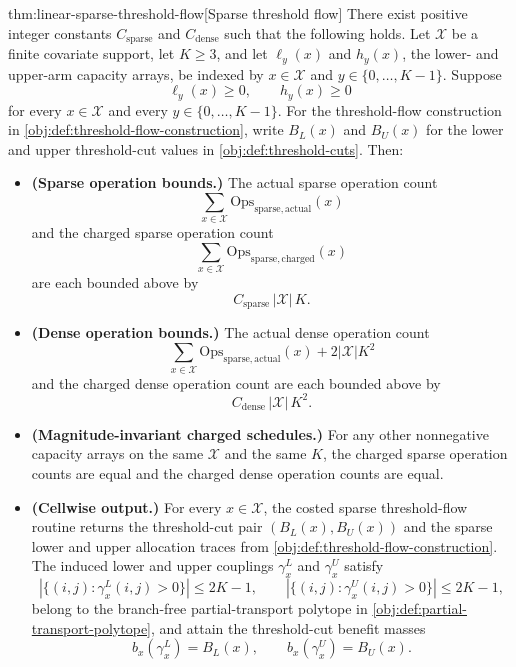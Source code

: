\documentclass[11pt]{article}
\begin{document}
\begin{theoremv}{thm:linear-sparse-threshold-flow}[Sparse threshold flow]
There exist positive integer constants \(C_{\mathrm{sparse}}\) and \(C_{\mathrm{dense}}\) such that the following holds.  Let \(\mathcal X\) be a finite covariate support, let \(K\ge 3\), and let \(\ell_y(x)\) and \(h_y(x)\), the lower- and upper-arm capacity arrays, be indexed by \(x\in\mathcal X\) and \(y\in\{0,\ldots,K-1\}\).  Suppose
\[
\ell_y(x)\ge 0,\qquad h_y(x)\ge 0
\]
for every \(x\in\mathcal X\) and every \(y\in\{0,\ldots,K-1\}\).  For the threshold-flow construction in \cref{obj:def:threshold-flow-construction}, write \(B_L(x)\) and \(B_U(x)\) for the lower and upper threshold-cut values in \cref{obj:def:threshold-cuts}.  Then:
\begin{itemize}
\item \textbf{(Sparse operation bounds.)} The actual sparse operation count
\[
\sum_{x\in\mathcal X}\mathrm{Ops}_{\mathrm{sparse,actual}}(x)
\]
and the charged sparse operation count
\[
\sum_{x\in\mathcal X}\mathrm{Ops}_{\mathrm{sparse,charged}}(x)
\]
are each bounded above by
\[
C_{\mathrm{sparse}}\,|\mathcal X|\,K .
\]

\item \textbf{(Dense operation bounds.)} The actual dense operation count
\[
\sum_{x\in\mathcal X}\mathrm{Ops}_{\mathrm{sparse,actual}}(x)+2|\mathcal X|K^2
\]
and the charged dense operation count are each bounded above by
\[
C_{\mathrm{dense}}\,|\mathcal X|\,K^2 .
\]

\item \textbf{(Magnitude-invariant charged schedules.)} For any other nonnegative capacity arrays on the same \(\mathcal X\) and the same \(K\), the charged sparse operation counts are equal and the charged dense operation counts are equal.

\item \textbf{(Cellwise output.)} For every \(x\in\mathcal X\), the costed sparse threshold-flow routine returns the threshold-cut pair \((B_L(x),B_U(x))\) and the sparse lower and upper allocation traces from \cref{obj:def:threshold-flow-construction}.  The induced lower and upper couplings \(\gamma_x^L\) and \(\gamma_x^U\) satisfy
\[
|\{(i,j):\gamma_x^L(i,j)>0\}|\le 2K-1,
\qquad
|\{(i,j):\gamma_x^U(i,j)>0\}|\le 2K-1,
\]
belong to the branch-free partial-transport polytope in \cref{obj:def:partial-transport-polytope}, and attain the threshold-cut benefit masses
\[
b_x(\gamma_x^L)=B_L(x),
\qquad
b_x(\gamma_x^U)=B_U(x).
\]
\end{itemize}
\end{theoremv}
\end{document}
